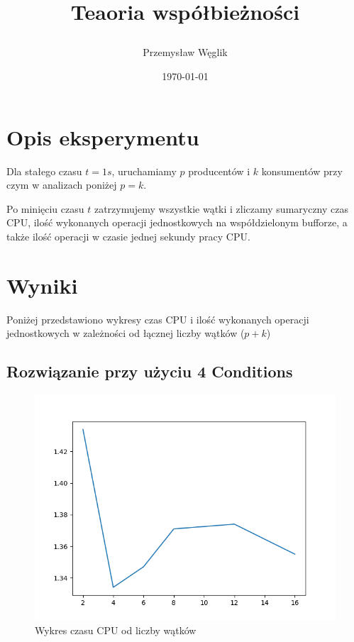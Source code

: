 \documentclass[12pt,a4paper,table]{article}
\begin{document}
    \title {
        Teaoria współbieżności

    }

    \author{
        Przemysław Węglik
    }

    \date{\today}

    \maketitle

    \section{Opis eksperymentu}

    Dla stałego czasu $t = 1s$, uruchamiamy $p$ producentów i 
    $k$ konsumentów przy czym w analizach poniżej $p = k$.
    
    Po minięciu czasu $t$ zatrzymujemy wszystkie wątki i zliczamy
    sumaryczny czas CPU, ilość wykonanych operacji jednostkowych
    na współdzielonym bufforze, a także ilość operacji w czasie 
    jednej sekundy pracy CPU.

    \section{Wyniki}

    Poniżej przedstawiono wykresy czas CPU i 
    ilość wykonanych operacji jednostkowych w zależności od
    łącznej liczby wątków ($p + k$)

    \subsection{Rozwiązanie przy użyciu 4 Conditions}
    \begin{figure}[H]
        \centering
        \includegraphics[width=0.6\linewidth]{img/4_cond_cpu.png}
        \caption{Wykres czasu CPU od liczby wątków}
        \label{fig:4_cond_cpu}
    \end{figure}
\end{document}
